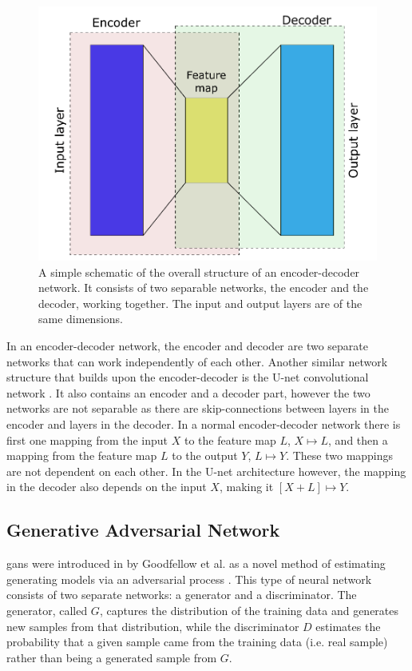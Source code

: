 \begin{figure}[htbp]  
    \centering
    \includegraphics[width=.7\textwidth]{figures/encoderdecoder.pdf}
    \caption[Encoder-decoder network]{A simple schematic of the overall structure of an encoder-decoder network. It consists of two separable networks, the encoder and the decoder, working together. The input and output layers are of the same dimensions. }
    \label{fig:encoderdecoder}
\end{figure}

In an encoder-decoder network, the encoder and decoder are two separate networks that can work independently of each other. Another similar network structure that builds upon the encoder-decoder is the U-net convolutional network \cite{unet}. It also contains an encoder and a decoder part, however the two networks are not separable as there are skip-connections between layers in the encoder and layers in the decoder. In a normal encoder-decoder network there is first one mapping from the input $X$ to the feature map $L$, $X \mapsto L$, and then a mapping from the feature map $L$ to the output $Y$, $L \mapsto Y$. These two mappings are not dependent on each other. In the U-net architecture however,  the mapping in the decoder also depends on the input $X$, making it $[X+L] \mapsto Y$. 


\subsection{Generative Adversarial Network}
\label{sec:ml:types:gan}
\acrfull{gan}s were introduced in \citeyear{goodfellow2014gan} by Goodfellow et al.  as a novel method of estimating generating models via an adversarial process \cite{goodfellow2014gan}. This type of neural network consists of two separate networks: a generator and a discriminator. The generator, called $G$, captures the distribution of the training data and generates new samples from that distribution, while the discriminator $D$ estimates the probability that a given sample came from the training data (i.e. real sample) rather than being a generated sample from $G$. 

